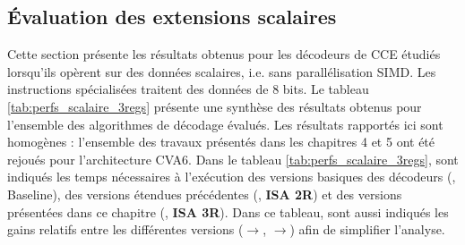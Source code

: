 \documentclass[../main.tex]{subfiles}
\begin{document}
\subsection{Évaluation des extensions scalaires}
%
%
%
%
Cette section présente les résultats obtenus pour les décodeurs de CCE étudiés lorsqu'ils opèrent sur des données scalaires, i.e. sans parallélisation SIMD. Les instructions spécialisées traitent des données de 8 bits.
Le tableau \ref{tab:perfs_scalaire_3regs} présente une synthèse des résultats obtenus pour l'ensemble des algorithmes de décodage évalués. 
Les résultats rapportés ici sont homogènes : l'ensemble des travaux présentés dans les chapitres 4 et 5 ont été rejoués pour l'architecture CVA6.
Dans le tableau \ref{tab:perfs_scalaire_3regs}, sont indiqués les temps nécessaires à l'exécution des versions basiques des décodeurs (, Baseline), des versions étendues précédentes (, \textbf{ISA 2R}) et des versions présentées dans ce chapitre (, \textbf{ISA 3R}).
Dans ce tableau, sont aussi indiqués les gains relatifs entre les différentes versions ($\rightarrow$, $\rightarrow$) afin de simplifier l'analyse.
\end{document}

